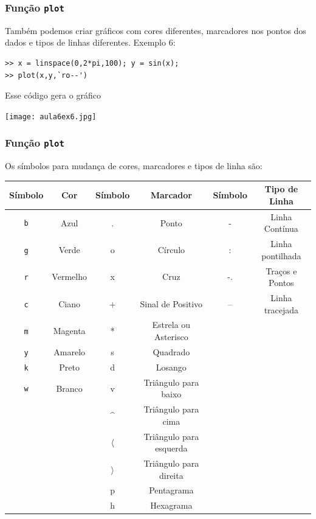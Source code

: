 \documentclass{beamer}
\newcommand{\ssiz}{\scriptsize}
\begin{document}
\begin{frame}[fragile]
\frametitle{Fun\c{c}\~ao {\tt plot}}

Tamb\'em podemos criar gr\'aficos com cores diferentes, marcadores nos pontos
dos dados e tipos de linhas diferentes.
\pause
Exemplo 6:
{\ssiz
\begin{verbatim}
>> x = linspace(0,2*pi,100); y = sin(x);
>> plot(x,y,`ro--')
\end{verbatim}
}
\pause
Esse c\'odigo gera o gr\'afico
\begin{center}
\texttt{[image: aula6ex6.jpg]}
\end{center}
\end{frame}

\begin{frame}[fragile]
\frametitle{Fun\c{c}\~ao {\tt plot}}

Os s\'imbolos para mudan\c{c}a de cores, marcadores e tipos de linha s\~ao:
{\tiny
\begin{center}
\begin{tabular}{|c|c|c|c|c|c|}
\hline
S\'imbolo & Cor & S\'imbolo & Marcador & S\'imbolo & Tipo de Linha \\ \hline
{\tt b} & Azul & . & Ponto & - & Linha Cont\'inua \\ \hline
{\tt g} & Verde & o & C\'irculo & : & Linha pontilhada \\ \hline
{\tt r} & Vermelho & x & Cruz & -. & Tra\c{c}os e Pontos \\ \hline
{\tt c} & Ciano & + & Sinal de Positivo & -- & Linha tracejada \\ \hline
{\tt m} & Magenta & * & Estrela ou Asterisco & & \\ \hline
{\tt y} & Amarelo & s & Quadrado & & \\ \hline
{\tt k} & Preto & d & Losango & & \\ \hline
{\tt w} & Branco & v & Tri\^angulo para baixo & & \\ \hline
& & \textasciicircum & Tri\^angulo para cima & & \\ \hline
& & $\langle$ & Tri\^angulo para esquerda & & \\ \hline
& & $\rangle$ & Tri\^angulo para direita & & \\ \hline
& & p & Pentagrama & & \\ \hline
& & h & Hexagrama & & \\ \hline
\end{tabular}
\end{center}
}

\end{frame}
\end{document}
